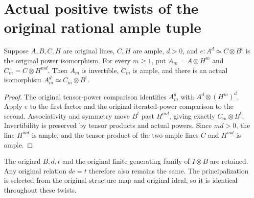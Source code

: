 \section{Actual positive twists of the original rational ample tuple}

\begin{lemma}
\label{lem:kn-original-rational-ample-twist-data}
\leanok
Suppose $A,B,C,H$ are original lines, $C,H$ are ample, $d>0$,
and $e:A^d\simeq C\otimes B^t$ is the original power isomorphism.
For every $m\geq1$, put $A_m=A\otimes H^m$ and
$C_m=C\otimes H^{md}$. Then $A_m$ is invertible, $C_m$ is ample,
and there is an actual isomorphism
$A_m^d\simeq C_m\otimes B^t$.
\end{lemma}
\begin{proof}
The original tensor-power comparison identifies $A_m^d$ with
$A^d\otimes(H^m)^d$. Apply $e$ to the first factor and the original
iterated-power comparison to the second. Associativity and symmetry
move $B^t$ past $H^{md}$, giving exactly $C_m\otimes B^t$.
Invertibility is preserved by tensor products and actual powers.
Since $md>0$, the line $H^{md}$ is ample, and the tensor product
of the two ample lines $C$ and $H^{md}$ is ample.
\end{proof}

The original $B,d,t$ and the original finite generating family of
$I\otimes B$ are retained. Any original relation $dc=t$ therefore
also remains the same. The principalization is selected from the original
structure map and original ideal, so it is identical throughout these twists.
